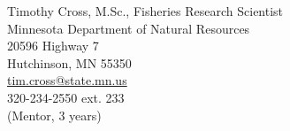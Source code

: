 \documentclass[letterpaper,12pt]{article}
\begin{document}

Timothy Cross, M.Sc., Fisheries Research Scientist \\
Minnesota Department of Natural Resources \\
20596 Highway 7\\
Hutchinson, MN 55350 \\
\href{mailto:tim.cross@state.mn.us}{tim.cross@state.mn.us} \\
320-234-2550 ext. 233 \\
(Mentor, 3 years) \\
\end{document}
